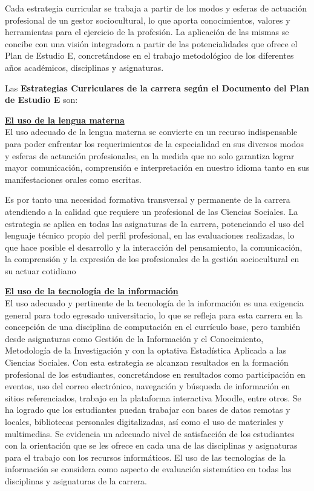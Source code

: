 Cada estrategia curricular se trabaja a partir de los modos y esferas de actuación profesional de un gestor sociocultural, lo que aporta conocimientos, valores y herramientas para el ejercicio de la profesión. La aplicación de las mismas se concibe con una visión integradora a partir de las potencialidades que ofrece el Plan de Estudio E, concretándose en el trabajo metodológico de los diferentes años académicos, disciplinas y asignaturas.

Las \textbf{Estrategias Curriculares de la carrera según el Documento del Plan de Estudio E} son:



\underline{\textbf{El uso de la lengua materna}}\\
El uso adecuado de la lengua materna se convierte en un recurso indispensable para poder enfrentar los requerimientos de la especialidad en sus diversos modos y esferas de actuación profesionales, en la medida que no solo garantiza lograr mayor comunicación, comprensión e interpretación en nuestro idioma tanto en sus manifestaciones orales como escritas.

Es por tanto una necesidad formativa transversal y permanente de la carrera atendiendo a la calidad que requiere un profesional de las Ciencias Sociales. La estrategia se aplica en todas las asignaturas de la carrera, potenciando el uso del lenguaje técnico propio del perfil profesional, en las evaluaciones realizadas, lo que hace posible el desarrollo y la interacción del pensamiento, la comunicación, la comprensión y la expresión de los profesionales de la gestión sociocultural en su actuar cotidiano

\underline{\textbf{El uso de la tecnología de la información}}\\
El uso adecuado y pertinente de la tecnología de la información es una exigencia general para todo egresado universitario, lo que se refleja para esta carrera en la concepción de una disciplina de computación en el currículo base, pero también desde asignaturas como Gestión de la Información y el Conocimiento, Metodología de la Investigación y con la optativa Estadística Aplicada a las Ciencias Sociales. Con esta estrategia se alcanzan resultados en la formación profesional de los estudiantes, concretándose en resultados como participación en eventos, uso del correo electrónico, navegación y búsqueda de información en sitios referenciados, trabajo en la plataforma interactiva Moodle, entre otros. Se ha logrado que los estudiantes puedan trabajar con bases de datos remotas y locales, bibliotecas personales digitalizadas, así como el uso de materiales y multimedias. Se evidencia un adecuado nivel de satisfacción de los estudiantes con la orientación que se les ofrece en cada una de las disciplinas y asignaturas para el trabajo con los recursos informáticos. El uso de las tecnologías de la información se considera como aspecto de evaluación sistemático en todas las disciplinas y asignaturas de la carrera.

